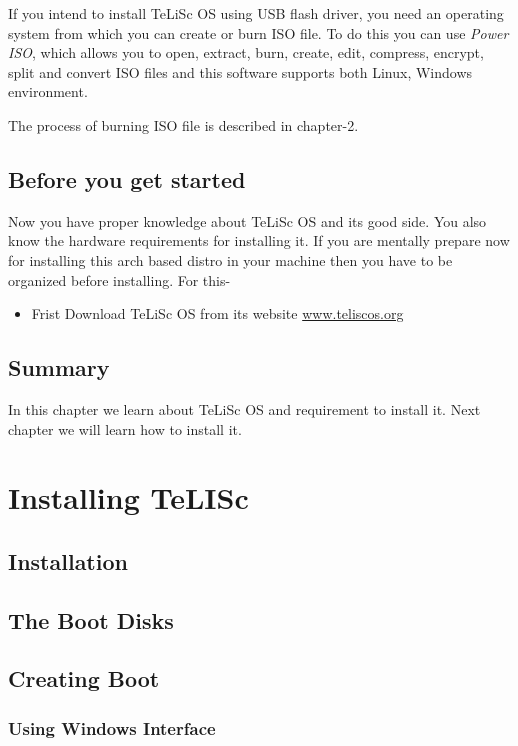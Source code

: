 \documentclass[a4paper,12pt]{book}
\begin{document}
    If you intend to install TeLiSc OS using USB flash driver, you need an operating system from which you can create or burn ISO file. To do this you can use \textit{Power ISO}, which allows you to open, extract, burn, create, edit, compress, encrypt, split and convert ISO files and this software supports both Linux, Windows environment. 
    
    The process of burning ISO file is described in chapter-2. 
    
    
    \section{Before you get started}
    
    Now you have proper knowledge about TeLiSc OS and its good side. You also know the hardware requirements for installing it. If you are mentally prepare now for installing this arch based distro in your machine then you have to be organized before installing. For this-
    
    \begin{itemize}
        \item Frist Download TeLiSc OS from its website \url{www.teliscos.org}
    \end{itemize}
    
    \section{Summary} 
    In this chapter  we learn about TeLiSc OS and requirement to install it. Next chapter we will learn how to install it.
    
    
    
    \chapter{Installing TeLISc}
    
    \section{Installation} 
    \section{The Boot Disks}
    
    \section{Creating Boot}
    \subsection{Using Windows Interface}
\end{document}
